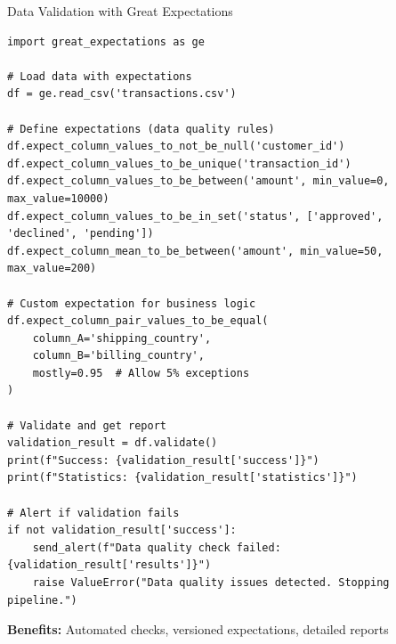 \begin{frame}[fragile]{Data Validation with Great Expectations}
\begin{lstlisting}[basicstyle=\ttfamily\tiny]
import great_expectations as ge

# Load data with expectations
df = ge.read_csv('transactions.csv')

# Define expectations (data quality rules)
df.expect_column_values_to_not_be_null('customer_id')
df.expect_column_values_to_be_unique('transaction_id')
df.expect_column_values_to_be_between('amount', min_value=0, max_value=10000)
df.expect_column_values_to_be_in_set('status', ['approved', 'declined', 'pending'])
df.expect_column_mean_to_be_between('amount', min_value=50, max_value=200)

# Custom expectation for business logic
df.expect_column_pair_values_to_be_equal(
    column_A='shipping_country',
    column_B='billing_country',
    mostly=0.95  # Allow 5% exceptions
)

# Validate and get report
validation_result = df.validate()
print(f"Success: {validation_result['success']}")
print(f"Statistics: {validation_result['statistics']}")

# Alert if validation fails
if not validation_result['success']:
    send_alert(f"Data quality check failed: {validation_result['results']}")
    raise ValueError("Data quality issues detected. Stopping pipeline.")
\end{lstlisting}

\textbf{Benefits:} Automated checks, versioned expectations, detailed reports
\end{frame}

